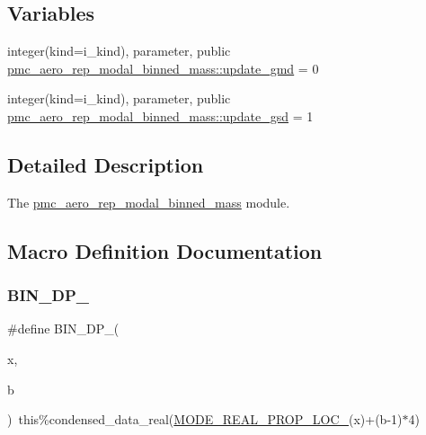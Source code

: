 \subsection*{Variables}
\begin{DoxyCompactItemize}
\item 
integer(kind=i\+\_\+kind), parameter, public \mbox{\hyperlink{namespacepmc__aero__rep__modal__binned__mass_a3e392f3475d58d74c9502c6548ef0c57}{pmc\+\_\+aero\+\_\+rep\+\_\+modal\+\_\+binned\+\_\+mass\+::update\+\_\+gmd}} = 0
\item 
integer(kind=i\+\_\+kind), parameter, public \mbox{\hyperlink{namespacepmc__aero__rep__modal__binned__mass_af36cf9b1476e17900c5534892f166736}{pmc\+\_\+aero\+\_\+rep\+\_\+modal\+\_\+binned\+\_\+mass\+::update\+\_\+gsd}} = 1
\end{DoxyCompactItemize}


\subsection{Detailed Description}
The \mbox{\hyperlink{namespacepmc__aero__rep__modal__binned__mass}{pmc\+\_\+aero\+\_\+rep\+\_\+modal\+\_\+binned\+\_\+mass}} module. 



\subsection{Macro Definition Documentation}
\mbox{\label{aero__rep__modal__binned__mass_8_f90_ad4bc2b2dfb9f2b8b2a94fa8f8bf048da}} 
\subsubsection{\texorpdfstring{B\+I\+N\+\_\+\+D\+P\+\_\+}{BIN\_DP\_}}
{\footnotesize\ttfamily \#define B\+I\+N\+\_\+\+D\+P\+\_\+(\begin{DoxyParamCaption}\item[{}]{x,  }\item[{}]{b }\end{DoxyParamCaption})~this\%condensed\+\_\+data\+\_\+real(\mbox{\hyperlink{aero__rep__modal__binned__mass_8_f90_ab695417de3b45908793bd92ca251cf91}{M\+O\+D\+E\+\_\+\+R\+E\+A\+L\+\_\+\+P\+R\+O\+P\+\_\+\+L\+O\+C\+\_\+}}(x)+(b-\/1)$\ast$4)}

